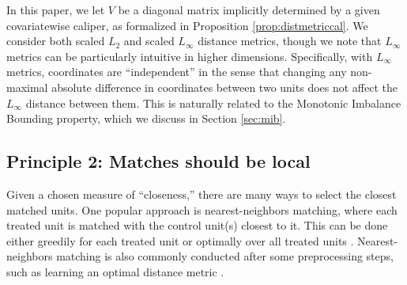 \documentclass{article}
\begin{document}
In this paper, we let $V$ be a diagonal matrix implicitly determined by a given covariatewise caliper, as formalized in Proposition \ref{prop:distmetriccal}.
We consider both scaled $L_2$ and scaled $L_\infty$ distance metrics, 
though we note that $L_\infty$ metrics can be particularly intuitive in higher dimensions.
Specifically, with $L_\infty$ metrics, coordinates are ``independent'' in the sense that changing any non-maximal absolute difference in coordinates between two units does not affect the $L_\infty$ distance between them.
This is naturally related to the Monotonic Imbalance Bounding \citep[MIB; ][]{iacus2011multivariate} property, which we discuss in Section \ref{sec:mib}.



\subsection{Principle 2: Matches should be local}
\label{sec:close}

Given a chosen measure of ``closeness,'' there are many ways to select the closest matched units.
One popular approach is nearest-neighbors matching, where each treated unit is matched with the control unit(s) closest to it.
This can be done either greedily for each treated unit \citep{rubin1973matching} or optimally over all treated units \citep{rosenbaum1989optimal}.
Nearest-neighbors matching is also commonly conducted after some preprocessing steps, such as learning an optimal distance metric \citep{diamond2013genetic, parikh2022malts}.
\end{document}
